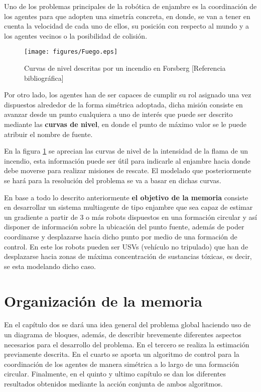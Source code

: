 Uno de los problemas principales de la robótica de enjambre es la coordinación de los agentes para que adopten una simetría concreta, en donde, se van a tener en cuenta la velocidad de cada uno de ellos, su posición con respecto al mundo y a los agentes vecinos o la posibilidad de colisión.\\

\begin{figure}[htb]
\centering
\texttt{[image: figures/Fuego.eps]}
\caption{Curvas de nivel descritas por un incendio en Forsberg [Referencia bibliográfica]} \label{fig:countour_levels}
\end{figure}

\newpage

Por otro lado, los agentes han de ser capaces de cumplir su rol asignado una vez dispuestos alrededor de la forma simétrica adoptada, dicha misión consiste en avanzar desde un punto cualquiera a uno de interés que puede ser descrito mediante las \textbf{curvas de nivel}, en donde el punto de máximo valor se le puede atribuir el nombre de fuente.

En la figura \ref{fig:countour_levels} se aprecian las curvas de nivel de la intensidad de la flama de un incendio, esta información puede ser útil para indicarle al enjambre hacia donde debe moverse para realizar misiones de rescate. El modelado que posteriormente se hará para la resolución del problema se va a basar en dichas curvas. 

En base a todo lo descrito anteriormente  \textbf{el objetivo de la memoria} consiste en desarrollar un sistema multiagente de tipo enjambre que sea capaz de estimar un gradiente a partir de 3 o más robots dispuestos en una formación circular y así disponer de información sobre la ubicación del punto fuente, además de poder coordinarse y desplazarse hacia dicho punto por medio de una formación de control. En este los robots pueden ser USVs (vehículo no tripulado) que han de desplazarse hacia zonas de máxima concentración de sustancias tóxicas, es decir, se esta modelando dicho caso.

\section{Organización de la memoria}

En el capítulo dos se dará una idea general del problema global haciendo uso de un diagrama de bloques, además, de describir brevemente diferentes aspectos necesarios para el desarrollo del problema. En el tercero se realiza la estimación previamente descrita. En el cuarto se aporta un algoritmo de control para la coordinación de los agentes de manera simétrica a lo largo de una formación circular. Finalmente, en el quinto y ultimo capítulo se dan los diferentes resultados obtenidos mediante la acción conjunta de ambos algoritmos.